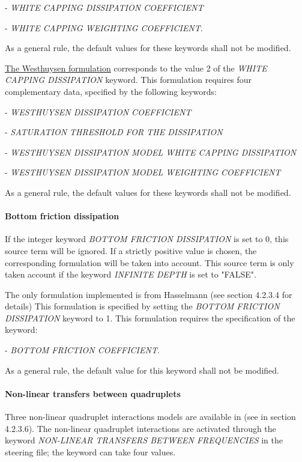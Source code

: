 - \textit{WHITE CAPPING DISSIPATION COEFFICIENT}   

- \textit{WHITE CAPPING WEIGHTING COEFFICIENT}.

  \textit{}

 As a general rule, the default values for these keywords shall not be modified.

 \underline{  The Westhuysen formulation} corresponds to the value 2 of the \textit{WHITE CAPPING DISSIPATION} keyword. This formulation requires four complementary data, specified by the following keywords:  

-  \textit{WESTHUYSEN DISSIPATION COEFFICIENT}

-  \textit{SATURATION THRESHOLD FOR THE DISSIPATION}

-  \textit{WESTHUYSEN DISSIPATION MODEL WHITE CAPPING DISSIPATION}

-  \textit{WESTHUYSEN DISSIPATION MODEL WEIGHTING COEFFICIENT}

  \textit{}

As a general rule, the default values for these keywords shall not be modified.

\paragraph{ Bottom friction dissipation}

If the integer keyword \textit{BOTTOM FRICTION DISSIPATION} is set to 0, this source term will be ignored. If a strictly positive
value is chosen, the corresponding formulation will be taken into account. This source term is only taken account if the keyword
\textit{INFINITE DEPTH} is set to "FALSE".

The only formulation implemented is from Hasselmann (see section 4.2.3.4 for details) This formulation is specified by setting the
\textit{BOTTOM FRICTION DISSIPATION} keyword to 1. This formulation requires the specification of the keyword:

  - \textit{BOTTOM FRICTION COEFFICIENT}.

 As a general rule, the default value for this keyword shall not be modified.


\paragraph{ Non-linear transfers between quadruplets}

Three non-linear quadruplet interactions models are available in \tomawac (see in section 4.2.3.6). The non-linear quadruplet
interactions are activated through the keyword \textit{NON-LINEAR TRANSFERS BETWEEN FREQUENCIES} in the steering file; the keyword
can take four values.

